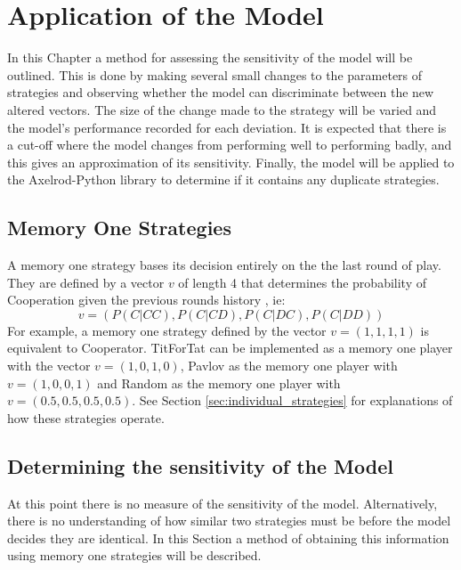 
\chapter{Application of the Model}\label{cha:applying-model}

In this Chapter a method for assessing the sensitivity of the model will be outlined.
This is done by making several small changes to the parameters of strategies and observing whether the model can discriminate between the new altered vectors.
The size of the change made to the strategy will be varied and the model's performance recorded for each deviation.
It is expected that there is a cut-off where the model changes from performing well to performing badly, and this gives an approximation of its sensitivity.
Finally, the model will be applied to the Axelrod-Python library to determine if it contains any duplicate strategies.



\section{Memory One Strategies}

A memory one strategy bases its decision entirely on the the last round of play.
They are defined by a vector $v$ of length 4 that determines the probability of Cooperation given the previous rounds history \cite{Akin2015}, ie:
$$
v = (P(C|CC), P(C|CD), P(C|DC), P(C|DD))
$$
For example, a memory one strategy defined by the vector $v=(1, 1, 1, 1)$ is equivalent to Cooperator.
TitForTat can be implemented as a memory one player with the vector $v=(1, 0, 1, 0)$, Pavlov as the memory one player with $v=(1, 0, 0, 1)$ and Random as the memory one player with $v=(0.5, 0.5, 0.5, 0.5)$.
See Section \ref{sec:individual_strategies} for explanations of how these strategies operate.



\section{Determining the sensitivity of the Model}

At this point there is no measure of the sensitivity of the model.
Alternatively, there is no understanding of how similar two strategies must be before the model decides they are identical.
In this Section a method of obtaining this information using memory one strategies will be described.


